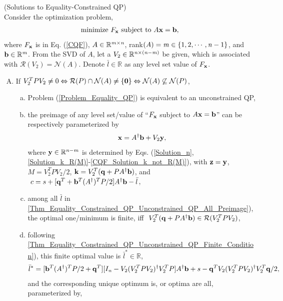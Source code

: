 \documentclass{imaman}
\newcommand{\beq}{\begin{eqnarray}}
\newcommand{\eeq}{\end{eqnarray}}
\newcommand{\bfb}{{\bf b}}
\newcommand{\bfx}{{\bf x}}
\newcommand{\bfq}{{\bf q}}
\newcommand{\bfy}{{\bf y}}
\newcommand{\bfk}{{\bf k}}
\newcommand{\bfz}{{\bf z}}
\newcommand{\bfzero}{{\bf 0}}
\newcommand{\real}{\mathbb{R}}
\newcommand{\calN}{{\mathcal N}}
\newcommand{\calR}{{\mathcal R}}
\newcommand{\itm}{{\it m}}
\newcommand{\itn}{{\it n}}
\numberwithin{equation}{section}
\begin{document}
\begin{theorem} (Solutions to Equality-Constrained QP)\\
Consider the optimization problem,
\beq
\mbox{minimize}~F_\bfx~\mbox{subject to}~A\bfx=\bfb,
\label{Problem_Equality_QP}
\eeq
where $F_\bfx$ is in Eq. {\rm(\ref{CQF})}, $A\in\real^{\itm\times\itn}$, rank$(A)=\itm\in\{1,2,\cdots,\itn-1\}$, and $\bfb\in\real^\itm$. From the SVD of $A$, let a $V_2\in\real^{\itn\times(\itn-\itm)}$ be given, which is associated with $\calR(V_2)=\calN(A)$. Denote $\bar l\in\real$ as any level set value of $F_\bfx$.
\begin{enumerate}[A)]
\item\label{Thm_Equality_Constrained_QP_Condition_Unconstrained_QP} If $V_2^TPV_2\ne 0\Leftrightarrow\calR(P)\cap\calN(A)\ne\{\bfzero\}\Leftrightarrow\calN(A)\not\subseteq\calN(P)$,
    \begin{enumerate}[a)]
    \item\label{Thm_Equality_Constrained_QP_Unconstrained_QP_Qquivalence} Problem {\rm(\ref{Problem_Equality_QP})} is equivalent to an unconstrained QP,
    \item\label{Thm_Equality_Constrained_QP_Unconstrained_QP_All_Preimage} the preimage of any level set/value of ``$F_\bfx$ subject to $A\bfx=\bfb$'' can be respectively parameterized by
        \beq
        \bfx=A^\dagger\bfb+V_2\bfy,
        \label{Parameterization_Equality_Constraint}
        \eeq
        where $\bfy\in\real^{\itn-\itm}$ is determined by Eqs. {\rm(\ref{Solution_n}}, {\rm\ref{Solution_k_R(M)}-\ref{CQF_Solution_k_not_R(M)})}, with $\bfz=\bfy$, $M=V_2^TPV_2/2$, $\bfk=V_2^T(\bfq+PA^\dagger\bfb)$, and $~c=s+[\bfq^T+\bfb^T(A^\dagger)^TP/2]A^\dagger\bfb-\bar l$,
    \item\label{Thm_Equality_Constrained_QP_Unconstrained_QP_Finite_Condition} among all $\bar l$ in {\rm\ref{Thm_Equality_Constrained_QP_Unconstrained_QP_All_Preimage})}, the optimal one/minimum is finite, iff $~V_2^T(\bfq+PA^\dagger\bfb)\in\calR(V_2^TPV_2)$,
    \item\label{Thm_Equality_Constrained_QP_Unconstrained_QP_Optimal_Value_Optimum} following {\rm\ref{Thm_Equality_Constrained_QP_Unconstrained_QP_Finite_Condition})}, this finite optimal value is $\bar l^*\in\real$,
        \beq
        \bar l^*=[\bfb^T(A^\dagger)^TP/2+\bfq^T][I_\itn-V_2(V_2^TPV_2)^\dagger V_2^TP]A^\dagger\bfb+s-\bfq^TV_2(V_2^TPV_2)^\dagger V_2^T\bfq/2,
        \label{Optimal_Value_Equality_Constrained_QP_Unconstrained_QP}
        \eeq
        and the corresponding unique optimum is, or optima are all, parameterized by,

\end{enumerate}
\end{enumerate}
\end{theorem}
\end{document}
